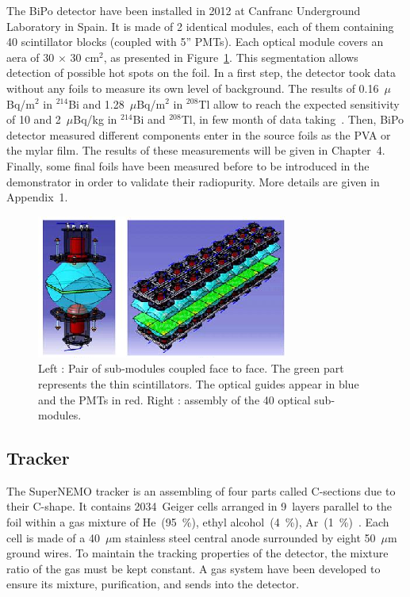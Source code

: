 \documentclass[main.tex]{subfiles}
\begin{document}
\NI The BiPo detector have been installed in 2012 at Canfranc Underground Laboratory in Spain. It is made of 2 identical modules, each of them containing 40 scintillator blocks (coupled with 5'' PMTs). Each optical module covers an aera of 30 $\times$ 30 cm$^\text{2}$, as presented in Figure~\ref{BiPoDetector}. This segmentation allows detection of possible hot spots on the foil. In a first step, the detector took data without any foils to measure its own level of background. The results of 0.16~$\mu$Bq/m$^\text{2}$ in $^{\text{214}}$Bi and 1.28~$\mu$Bq/m$^\text{2}$ in $^{\text{208}}$Tl allow to reach the expected sensitivity of 10 and 2~$\mu$Bq/kg in $^{\text{214}}$Bi and $^{\text{208}}$Tl, in few month of data taking~\cite{BiPoDetector}. Then, BiPo detector measured different components enter in the source foils as the PVA or the mylar film. The results of these measurements will be given in Chapter~4. Finally, some final foils have been measured before to be introduced in the demonstrator in order to validate their radiopurity. More details are given in Appendix~1.  


\begin{figure}[h!]
\begin{center}
\includegraphics[scale=1.1]{pictures/Chap3/snemo_bipo.png}
\caption{Left : Pair of sub-modules coupled face to face. The green part represents the thin scintillators. The optical guides appear in blue and the PMTs in red. Right : assembly of the 40 optical sub-modules.}
\label{BiPoDetector}
\end{center}
\end{figure}



\FloatBarrier


\subsection{Tracker}


\NI The SuperNEMO tracker is an assembling of four parts called C-sections due to their C-shape. It contains 2034~Geiger cells arranged in 9~layers parallel to the foil within a gas mixture of He~(95~\%), ethyl alcohol~(4~\%), Ar~(1~\%)~\cite{trackerSN}. Each cell is made of a 40~$\mu$m stainless steel central anode surrounded by eight 50~$\mu$m ground wires. To maintain the tracking properties of the detector, the mixture ratio of the gas must be kept constant. A gas system have been developed to ensure its mixture, purification, and sends into the detector. 
\end{document}
